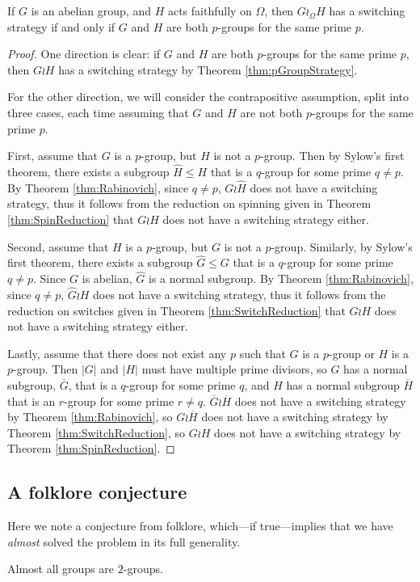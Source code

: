\begin{theorem}
  If $G$ is an abelian group, and $H$ acts faithfully on $\Omega$, then
  $G \wr_\Omega H$ has a switching strategy if and only if $G$ and $H$ are
  both $p$-groups for the same prime $p$.
\label{thm:classifyAbelianSwitches}
\end{theorem}
\begin{proof}
  One direction is clear: if $G$ and $H$ are both $p$-groups for the same prime
  $p$, then $G \wr H$ has a switching strategy by Theorem \ref{thm:pGroupStrategy}.

  For the other direction, we will consider the contrapositive assumption,
  split into three cases, each time assuming that
  $G$ and $H$ are not both $p$-groups for the same prime $p$.

  First, assume that $G$ is a $p$-group, but $H$ is not a $p$-group. Then by
  Sylow's first theorem, there exists a subgroup $\hat{H} \leq H$ that is a $q$-group
  for some prime $q \neq p$. By Theorem \ref{thm:Rabinovich}, since $q \neq p$,
  $G \wr \hat{H}$ does not have a switching strategy, thus it follows from
  the reduction on spinning given in Theorem \ref{thm:SpinReduction} that
  $G \wr H$ does not have a switching strategy either.

  Second, assume that $H$ is a $p$-group, but $G$ is not a $p$-group. Similarly,
  by Sylow's first theorem, there exists a subgroup $\hat{G} \leq G$ that is
  a $q$-group for some prime $q \neq p$. Since $G$ is abelian, $\hat{G}$ is a
  normal subgroup. By Theorem \ref{thm:Rabinovich}, since $q \neq p$,
  $\hat G \wr H$ does not have a switching strategy, thus it follows from
  the reduction on switches given in Theorem \ref{thm:SwitchReduction} that
  $G \wr H$ does not have a switching strategy either.

  Lastly, assume that there does not exist any $p$ such that $G$ is a $p$-group
  or $H$ is a $p$-group. Then $|G|$ and $|H|$ must have multiple prime divisors,
  so $G$ has a normal subgroup, $\overline G$, that is a $q$-group for some prime $q$, and
  $H$ has a normal subgroup $\overline H$ that is an $r$-group for some prime $r \neq q$.
  $\overline G \wr \overline H$ does not have a switching strategy by Theorem \ref{thm:Rabinovich},
  so $G \wr \overline H$ does not have a switching strategy by Theorem \ref{thm:SwitchReduction},
  so $G \wr H$ does not have a switching strategy by Theorem \ref{thm:SpinReduction}.
\end{proof}

\subsection{A folklore conjecture}
Here we note a conjecture from folklore, which---if true---implies that we have
\textit{almost} solved the problem in its full generality.
\begin{conjecture}[Folklore]
  Almost all groups are $2$-groups.
\end{conjecture}

